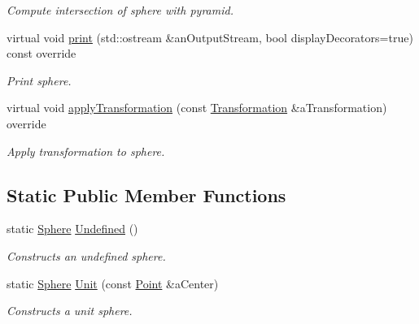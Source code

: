 \begin{DoxyCompactItemize}
\begin{DoxyCompactList}\small\item\em Compute intersection of sphere with pyramid. \end{DoxyCompactList}\item 
virtual void \hyperlink{classlibrary_1_1math_1_1geom_1_1d3_1_1objects_1_1_sphere_adc05fd7666ae15513e6aa9ec66a1ca9b}{print} (std\+::ostream \&an\+Output\+Stream, bool display\+Decorators=true) const override
\begin{DoxyCompactList}\small\item\em Print sphere. \end{DoxyCompactList}\item 
virtual void \hyperlink{classlibrary_1_1math_1_1geom_1_1d3_1_1objects_1_1_sphere_acb4ca3f037791f9f71bffc904a1bf961}{apply\+Transformation} (const \hyperlink{classlibrary_1_1math_1_1geom_1_1d3_1_1_transformation}{Transformation} \&a\+Transformation) override
\begin{DoxyCompactList}\small\item\em Apply transformation to sphere. \end{DoxyCompactList}\end{DoxyCompactItemize}
\subsection*{Static Public Member Functions}
\begin{DoxyCompactItemize}
\item 
static \hyperlink{classlibrary_1_1math_1_1geom_1_1d3_1_1objects_1_1_sphere}{Sphere} \hyperlink{classlibrary_1_1math_1_1geom_1_1d3_1_1objects_1_1_sphere_a777600f8814a2879e925909f30cfe9c4}{Undefined} ()
\begin{DoxyCompactList}\small\item\em Constructs an undefined sphere. \end{DoxyCompactList}\item 
static \hyperlink{classlibrary_1_1math_1_1geom_1_1d3_1_1objects_1_1_sphere}{Sphere} \hyperlink{classlibrary_1_1math_1_1geom_1_1d3_1_1objects_1_1_sphere_a5464ea9145425db63dedbd896d6c97b0}{Unit} (const \hyperlink{classlibrary_1_1math_1_1geom_1_1d3_1_1objects_1_1_point}{Point} \&a\+Center)
\begin{DoxyCompactList}\small\item\em Constructs a unit sphere. \end{DoxyCompactList}\end{DoxyCompactItemize}


